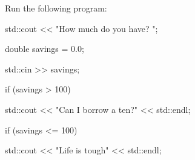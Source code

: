 Run the following program:

\begin{console}

std::cout << "How much do you have? ";

double savings = 0.0;

std::cin >> savings;



if (savings > 100)

   std::cout << "Can I borrow a ten?" << std::endl;

if (savings <= 100)

   std::cout << "Life is tough" << std::endl;

\end{console}

